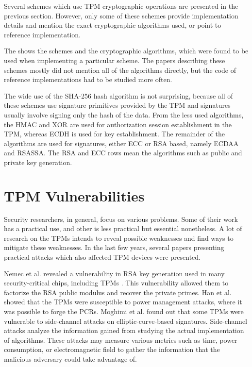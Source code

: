 Several schemes which use TPM cryptographic operations are presented in the previous section. However, only some of these schemes provide implementation details and mention the exact cryptographic algorithms used, or point to reference implementation. 

The  shows the schemes and the cryptographic algorithms, which were found to be used when implementing a particular scheme. The papers describing these schemes mostly did not mention all of the algorithms directly, but the code of reference implementations had to be studied more often.

The wide use of the SHA-256 hash algorithm is not surprising, because all of these schemes use signature primitives provided by the TPM and signatures usually involve signing only the hash of the data. From the less used algorithms, the HMAC and XOR are used for authorization session establishment in the TPM, whereas ECDH is used for key establishment. The remainder of the algorithms are used for signatures, either ECC or RSA based, namely ECDAA and RSASSA. The RSA and ECC rows mean the algorithms such as public and private key generation.

\section{TPM Vulnerabilities}
Security researchers, in general, focus on various problems. Some of their work has a practical use, and other is less practical but essential nonetheless. A lot of research on the TPMs intends to reveal possible weaknesses and find ways to mitigate these weaknesses. In the last few years, several papers presenting practical attacks which also affected TPM devices were presented.

Nemec et al. revealed a vulnerability in RSA key generation used in many security-critical chips, including TPMs \cite{2017-ccs-nemec}. This vulnerability allowed them to factorize the RSA public modulus and recover the private primes. Han et al. \cite{han2018sleep} showed that the TPMs were susceptible to power management attacks, where it was possible to forge the PCRs. Moghimi et al. \cite{moghimi2020fail} found out that some TPMs were vulnerable to side-channel attacks on elliptic-curve-based signatures. Side-channel attacks analyze the information gained from studying the actual implementation of algorithms. These attacks may measure various metrics such as time, power consumption, or electromagnetic field to gather the information that the malicious adversary could take advantage of.



